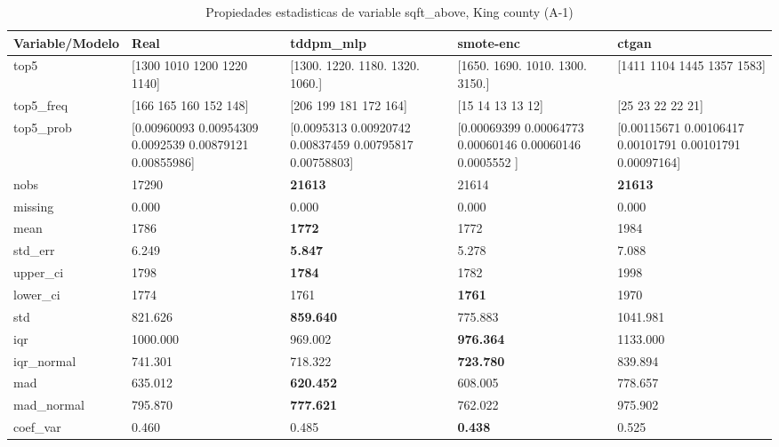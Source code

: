 \begin{table}[H]
\centering
\fontsize{8}{14}\selectfont
\caption{Propiedades  estadisticas de variable sqft\_above, King county (A-1)}
\label{table-stats-king county-a-1-sqft_above}
\begin{tabular}{|l|m{10em}|m{10em}|m{10em}|m{10em}|}
\hline
 \rowcolor[gray]{0.8}
Variable/Modelo & Real & tddpm\_mlp & smote-enc & ctgan \\
\hline top5 & [1300 1010 1200 1220 1140] & [1300. 1220. 1180. 1320. 1060.] & [1650. 1690. 1010. 1300. 3150.] & [1411 1104 1445 1357 1583] \\
\hline top5\_freq & [166 165 160 152 148] & [206 199 181 172 164] & [15 14 13 13 12] & [25 23 22 22 21] \\
\hline top5\_prob & [0.00960093 0.00954309 0.0092539  0.00879121 0.00855986] & [0.0095313  0.00920742 0.00837459 0.00795817 0.00758803] & [0.00069399 0.00064773 0.00060146 0.00060146 0.0005552 ] & [0.00115671 0.00106417 0.00101791 0.00101791 0.00097164] \\
\hline nobs & 17290 & \bfseries 21613 & \cellcolor[rgb]{0.9, 0.54, 0.52} 21614 & \bfseries 21613 \\
\hline missing & 0.000 & 0.000 & 0.000 & 0.000 \\
\hline mean & 1786 & \bfseries 1772 & 1772 & \cellcolor[rgb]{0.9, 0.54, 0.52} 1984 \\
\hline std\_err & 6.249 & \bfseries 5.847 & \cellcolor[rgb]{0.9, 0.54, 0.52} 5.278 & 7.088 \\
\hline upper\_ci & 1798 & \bfseries 1784 & 1782 & \cellcolor[rgb]{0.9, 0.54, 0.52} 1998 \\
\hline lower\_ci & 1774 & 1761 & \bfseries 1761 & \cellcolor[rgb]{0.9, 0.54, 0.52} 1970 \\
\hline std & 821.626 & \bfseries 859.640 & 775.883 & \cellcolor[rgb]{0.9, 0.54, 0.52} 1041.981 \\
\hline iqr & 1000.000 & 969.002 & \bfseries 976.364 & \cellcolor[rgb]{0.9, 0.54, 0.52} 1133.000 \\
\hline iqr\_normal & 741.301 & 718.322 & \bfseries 723.780 & \cellcolor[rgb]{0.9, 0.54, 0.52} 839.894 \\
\hline mad & 635.012 & \bfseries 620.452 & 608.005 & \cellcolor[rgb]{0.9, 0.54, 0.52} 778.657 \\
\hline mad\_normal & 795.870 & \bfseries 777.621 & 762.022 & \cellcolor[rgb]{0.9, 0.54, 0.52} 975.902 \\
\hline coef\_var & 0.460 & 0.485 & \bfseries 0.438 & \cellcolor[rgb]{0.9, 0.54, 0.52} 0.525 \\

\end{tabular}
\end{table}
